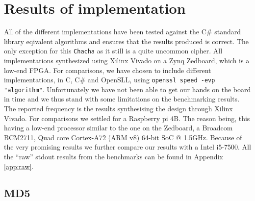 \documentclass[a4paper]{article}
\begin{document}
\section{Results of implementation}
\label{sec:org85d3b64}
All of the different implementations have been tested against the C\# standard library eqivalent algorithms and ensures that the results produced is correct. The only exception for this \texttt{Chacha} as it still is a quite uncommon cipher. All implementations synthesized using Xilinx Vivado on a Zynq Zedboard, which is a low-end FPGA. For comparisons, we have chosen to include different implementations, in C, C\# and OpenSLL, using \texttt{openssl speed -evp "algorithm"}. Unfortunately we have not been able to get our hands on the board in time and we thus stand with some limitations on the benchmarking results. The reported frequency is the results synthesising the design through Xilinx Vivado. For comparisons we settled for a Raspberry pi 4B. The reason being, this having a low-end processor similar to the one on the Zedboard, a Broadcom BCM2711, Quad core Cortex-A72 (ARM v8) 64-bit SoC @ 1.5GHz. Because of the very promising results we further compare our results with a Intel i5-7500. All the ``raw'' stdout results from the benchmarks can be found in Appendix \ref{app:raw}.
\subsection{MD5}
\label{sec:org1df6bdc}
\label{sec:MD5performance}
\end{document}
